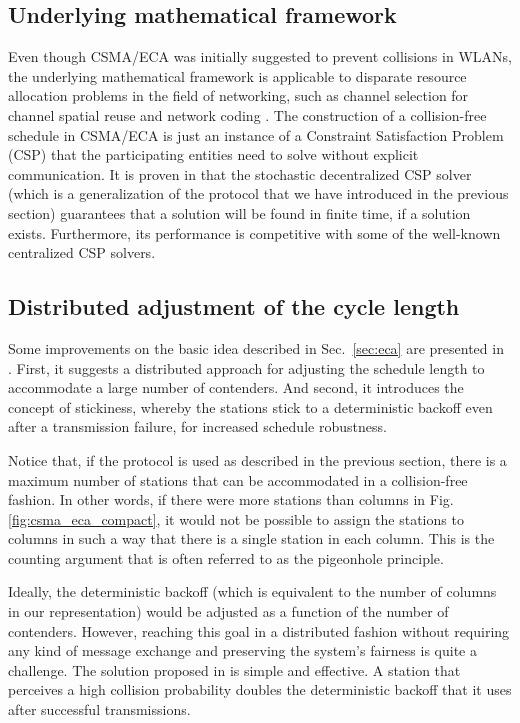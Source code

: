 \documentclass[journal]{IEEEtran}
\begin{document}
\subsection{Underlying mathematical framework}
Even though CSMA/ECA was initially suggested to prevent collisions in WLANs, the underlying mathematical framework is applicable to disparate resource allocation problems in the field of networking, such as channel selection for channel spatial reuse and network coding \cite{duffy2011dcs}.
The construction of a collision-free schedule in CSMA/ECA is just an instance of a Constraint Satisfaction Problem (CSP) that the participating entities need to solve without explicit communication.
It is proven in \cite{duffy2011dcs} that the stochastic decentralized CSP solver (which is a generalization of the protocol that we have introduced in the previous section) guarantees that a solution will be found in finite time, if a solution exists.
Furthermore, its performance is competitive with some of the well-known centralized CSP solvers.

\subsection{Distributed adjustment of the cycle length}

Some improvements on the basic idea described in Sec.~\ref{sec:eca} are presented in \cite{fang2011dlm}. 
First, it suggests a distributed approach for adjusting the schedule length to accommodate a large number of contenders.
And second, it introduces the concept of stickiness, whereby the stations stick to a deterministic backoff even after a transmission failure, for increased schedule robustness. 

Notice that, if the protocol is used as described in the previous section, there is a maximum number of stations that can be accommodated in a collision-free fashion.
In other words, if there were more stations than columns in Fig. \ref{fig:csma_eca_compact}, it would not be possible to assign the stations to columns in such a way that there is a single station in each column.
This is the counting argument that is often referred to as the pigeonhole principle.

Ideally, the deterministic backoff (which is equivalent to the number of columns in our representation) would be adjusted as a function of the number of contenders.
However, reaching this goal in a distributed fashion without requiring any kind of message exchange and preserving the system's fairness is quite a challenge.
The solution proposed in \cite{fang2011dlm} is simple and effective.
A station that perceives a high collision probability doubles the deterministic backoff that it uses after successful transmissions.
\end{document}
